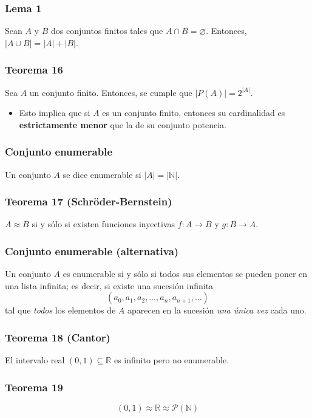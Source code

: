 \begin{multicols}{2}
    \subsubsection*{Lema 1}
    Sean $A$ y $B$ dos conjuntos finitos tales que $A \cap B = \varnothing$. Entonces, $|A \cup B| = |A| + |B|$.
    
    \subsubsection*{Teorema 16}
    Sea $A$ un conjunto finito. Entonces, se cumple que $|P(A)| = 2^{|A|}$.
    \begin{itemize}
        \item Esto implica que si $A$ es un conjunto finito, entonces su cardinalidad es \textbf{estrictamente menor} que la de su conjunto potencia.
    \end{itemize}
    
    \subsubsection*{Conjunto enumerable}
    Un conjunto $A$ se dice enumerable si $|A| = |\mathbb{N}|$.
    
    \subsubsection*{Teorema 17 (Schröder-Bernstein)}
    $A \approx B$ si y sólo si existen funciones inyectivas $f: A \rightarrow B$ y $g: B \rightarrow A$.
    
    \subsubsection*{Conjunto enumerable (alternativa)}
    Un conjunto $A$ es enumerable si y sólo si todos sus elementos se pueden poner en una lista infinita; es decir, si existe una sucesión infinita
    $$
    (a_0, a_1, a_2, \ldots, a_n, a_{n+1}, \ldots)
    $$
    tal que \textit{todos} los elementos de $A$ aparecen en la sucesión \textit{una única vez} cada uno.
    
    \subsubsection*{Teorema 18 (Cantor)}
    El intervalo real $(0,1) \subseteq \mathbb{R}$ es infinito pero no enumerable.
    
    \subsubsection*{Teorema 19}
    $$
    (0, 1) \approx \mathbb{R} \approx \mathcal{P}(\mathbb{N})
    $$
    

\end{multicols}
